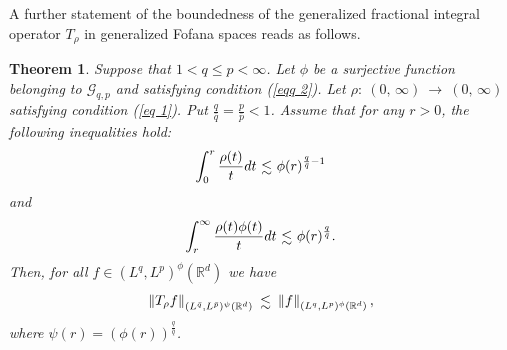 \documentclass[a4paper,12pt,intlimits,oneside]{amsart}
\numberwithin{equation}{section}
\newtheorem{theorem}{Theorem}[section]
\numberwithin{equation}{section}
\def\lsim{\raisebox{-1ex}{$~\stackrel{\textstyle <}{\sim}~$}}
\theoremstyle{definition}
\begin{document}
A further statement of the boundedness of the generalized fractional integral operator $T_{\rho}$ in generalized Fofana spaces reads as follows.
\begin{theorem}\label{theo 4}
Suppose that $1 < q\leq p < \infty$. Let $\phi$ be a surjective function belonging to $ \mathcal{G}_{q,p}$ and satisfying condition (\ref{eqq 2}). Let  $\rho : \: (0,\, \infty) \:  \to \: (0, \,\infty) \:$ satisfying condition (\ref{eq 1}).  
 Put $\frac{q}{\bar{q}} = \frac{p}{\bar{p}}<1$.
Assume that for any $r > 0$, the following inequalities hold:
\begin{equation}\label{eq 8}
\displaystyle\int_{0}^{r} \frac{\rho(t)}{t} dt \lsim  \phi(r)^{\frac{q}{\bar{q}}-1}
\end{equation}
and 
\begin{equation}\label{eq 9}
\displaystyle\int_{r}^{\infty} \frac{\rho(t)\phi(t)}{t} dt \lsim  \phi(r)^{\frac{q}{\bar{q}}}.
\end{equation}
 Then, for all  $f \in (L^{q},L^{p})^{\phi}(\mathbb{R}^{d})$ we have
 $$\left\Vert T_{\rho}f \right\Vert_{(L^{\bar{q}},L^{\bar{p}})^{\psi}(\mathbb{R}^{d})} \lsim  \left\Vert f  \right\Vert_{(L^{q},L^{p})^{\phi}(\mathbb{R}^{d})},$$ where  $\psi(r)= (\phi(r))^{\frac{q}{\bar{q}}}$.
\end{theorem}
\end{document}
